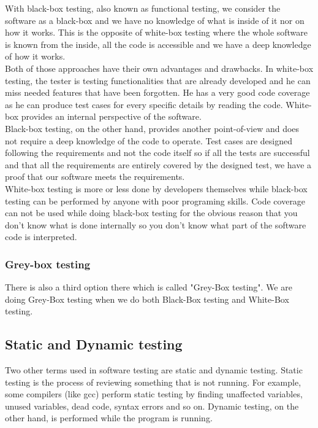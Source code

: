 \documentclass[12pt]{article}
\theoremstyle{definition}
\theoremstyle{definition}
\begin{document}
With black-box testing, also known as functional testing, we consider the software as a black-box and we have no knowledge of what is inside of it nor on how it works. This is the opposite of white-box testing where the whole software is known from the inside, all the code is accessible and we have a deep knowledge of how it works.\\

Both of those approaches have their own advantages and drawbacks. In white-box testing, the tester is testing functionalities that are already developed and he can miss needed features that have been forgotten. He has a very good code coverage as he can produce test cases for every specific details by reading the code. White-box provides an internal perspective of the software.\\

Black-box testing, on the other hand, provides another point-of-view and does not require a deep knowledge of the code to operate. Test cases are designed following the requirements and not the code itself so if all the tests are successful and that all the requirements are entirely covered by the designed test, we have a proof that our software meets the requirements.\\

White-box testing is more or less done by developers themselves while black-box testing can be performed by anyone with poor programing skills. Code coverage can not be used while doing black-box testing for the obvious reason that you don't know what is done internally so you don't know what part of the software code is interpreted.

\subsubsection{Grey-box testing}

There is also a third option there which is called "Grey-Box testing". We are doing Grey-Box testing when we do both Black-Box testing and White-Box testing.

\subsection{Static and Dynamic testing}

Two other terms used in software testing are static and dynamic testing. Static testing is the process of reviewing something that is not running. For example, some compilers (like gcc) perform static testing by finding unaffected variables, unused variables, dead code, syntax errors and so on. Dynamic testing, on the other hand, is performed while the program is running.
\end{document}
